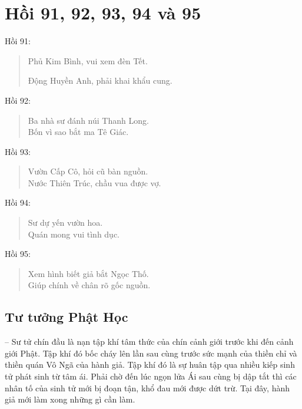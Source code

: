 \chapter{Hồi 91, 92, 93, 94 và 95} %
\label{cha:hoi_91_92_95}

Hồi 91:

\begin{verse}
\begin{itshape}
Phủ Kim Bình, vui xem đèn Tết.

Động Huyền Anh, phải khai khẩu cung.
\end{itshape}
\end{verse}

Hồi 92:

\begin{verse}
\begin{itshape}
Ba nhà sư đánh núi Thanh Long.\\
Bốn vì sao bắt ma Tê Giác.
\end{itshape}
\end{verse}

Hồi 93:

\begin{verse}
\begin{itshape}
Vườn Cấp Cô, hỏi cũ bàn nguồn.\\
Nước Thiên Trúc, chầu vua được vợ.
\end{itshape}
\end{verse}

Hồi 94:

\begin{verse}
\begin{itshape}
Sư dự yến vườn hoa.\\
Quán mong vui tình dục.
\end{itshape}
\end{verse}

Hồi 95:

\begin{verse}
\begin{itshape}
Xem hình biết giả bắt Ngọc Thố.\\
Giúp chính về chân rõ gốc nguồn.
\end{itshape}
\end{verse}

\section{Tư tưởng Phật Học} %
\label{sec:91_92_95_phat_hoc}

-- Sư tử chín đầu là nạn tập khí tâm thức của chín cảnh giới trước khi đến cảnh giới Phật. Tập khí đó bốc cháy lên lần sau cùng trước sức mạnh của thiền chỉ và thiền quán Vô Ngã của hành giả. Tập khí đó là sự huân tập qua nhiều kiếp sinh tử phát sinh từ tâm ái. Phải chờ đến lúc ngọn lửa Ái sau cùng bị dập tắt thì các nhân tố của sinh tử mới bị đoạn tận, khổ đau mới được dứt trừ. Tại đây, hành giả mới làm xong những gì cần làm.


